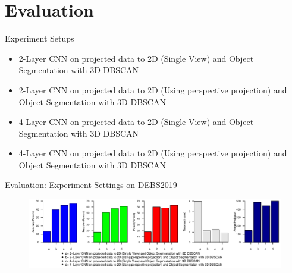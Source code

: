 \documentclass[9pt]{beamer}
\begin{document}

\section{Evaluation}


\begin{frame}[fragile]{Experiment Setups }
\begin{itemize}
	\item 2-Layer CNN on projected data to 2D (Single View) and Object Segmentation with 3D DBSCAN
	\item 2-Layer CNN on projected data to 2D (Using perspective projection) and Object Segmentation with 3D DBSCAN
	\item 4-Layer CNN on projected data to 2D (Single View) and Object Segmentation with 3D DBSCAN
	\item 4-Layer CNN on projected data to 2D (Using perspective projection) and Object Segmentation with 3D DBSCAN
\end{itemize}

\end{frame}


\begin{frame}[fragile]{Evaluation: Experiment Settings on DEBS2019 }
\begin{figure}
	\centering
	\includegraphics[width=\textwidth]{images/evaluation2.pdf}

\end{figure}
\end{frame}
\end{document}
